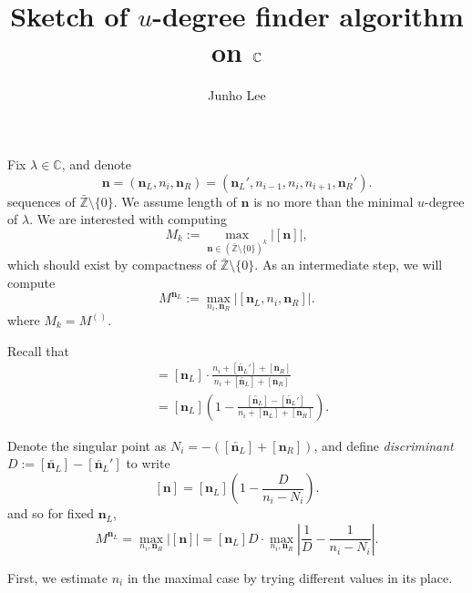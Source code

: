 \documentclass{article}
\title{Sketch of $u$-degree finder algorithm on $\bC$}
\author{Junho Lee}
\theoremstyle{definition}
\theoremstyle{plain}
\theoremstyle{remark}
\numberwithin{equation}{section}
\newcommand{\bZ}{\mathbb{Z}}
\newcommand{\bC}{\mathbb{C}}
\newcommand{\abs}[1]{\left| {#1} \right|}
\def\ns{{\mathbf{n}}}
\def\nsL{{\mathbf{n}_L}}
\def\nsR{{\mathbf{n}_R}}
\begin{document}
\maketitle

Fix $\lambda \in \bC$, and denote
\[
  \ns = (\nsL, n_i, \nsR) = (\nsL', n_{i-1}, n_i, n_{i+1}, \nsR').
\]
sequences of $\bar{\bZ} \setminus \{0\}$.
We assume length of $\ns$ is no more than the minimal $u$-degree of $\lambda$.
We are interested with computing
\[
  M_k := \max_{\ns \in (\bar{\bZ} \setminus \{0\})^k} \abs{[\ns]},
\]
which should exist by compactness of $\bar{\bZ} \setminus \{0\}$.
As an intermediate step, we will compute
\[ M^{\nsL} := \max_{n_i, \nsR} \abs{[\nsL, n_i, \nsR]}. \]
where $M_k = M^{()}$.

Recall that
\begin{align*}
  [\ns] & = [\nsL] \cdot \frac{n_i + [\overleftarrow{\nsL}'] + [\nsR]}{n_i + [\overleftarrow{\nsL}] + [\nsR]} \\
  & = [\nsL] \left( 1 - \frac{[\overleftarrow{\nsL}] - [\overleftarrow{\nsL}']}{n_i + [\nsL] + [\nsR]} \right).
\end{align*}

Denote the singular point as $N_i = - ([\overleftarrow{\nsL}] + [\nsR])$,
and define \textit{discriminant} $D := [\overleftarrow{\nsL}] - [\overleftarrow{\nsL}']$ to write
\[
  [\ns] = [\nsL] \left( 1 - \frac{D}{n_i - N_i} \right).
\]
and so for fixed $\nsL$,
\[
  M^{\nsL} = \max_{n_i, \nsR} \abs{[\ns]} = [\nsL] D \cdot \max_{n_i, \nsR} \left| \frac{1}{D} - \frac{1}{n_i - N_i} \right|.
\]

First, we estimate $n_i$ in the maximal case by trying different values in its place.
\end{document}
